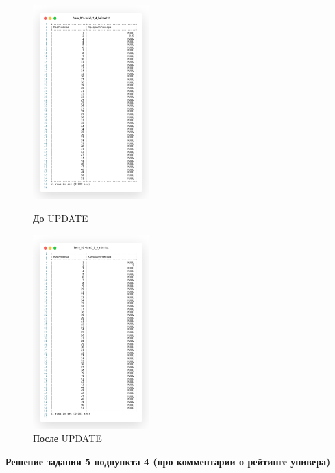 \begin{figure}[!h]
  \centering

  \begin{minipage}{0.49\textwidth}
    \centering

    \includegraphics[width=4.5cm]
    {../sql/task5/task5_2_4_before.png}

    \caption{До UPDATE}
    \label{fig:task5_2_4_before}
  \end{minipage}
  \begin{minipage}{0.49\textwidth}
    \centering

    \includegraphics[width=4.5cm]
    {../sql/task5/task5_2_4_after.png}

    \caption{После UPDATE}
    \label{fig:task5_2_4_after}
  \end{minipage}
\end{figure}

\newpage

\begin{center}
  \textbf{Решение задания 5 подпункта 4 (про комментарии о рейтинге универа)}
\end{center}




